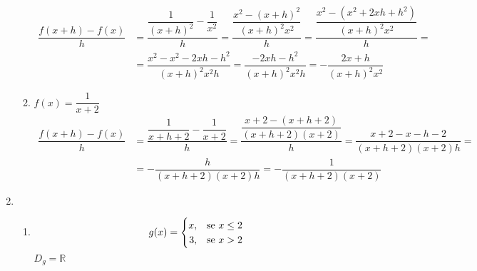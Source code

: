 \begin{enumerate}
\begin{enumerate}
\begin{equation*}
		\begin{split}
		\dfrac{f(x+h)-f(x)}{h}&=\dfrac{\dfrac{1}{(x+h)^2}-\dfrac{1}{x^2}}{h}=\dfrac{\dfrac{x^2-(x+h)^2}{(x+h)^2x^2}}{h}=\dfrac{\dfrac{x^2-(x^2+2xh+h^2)}{(x+h)^2x^2}}{h}=\\
								&=\dfrac{x^2-x^2-2xh-h^2}{(x+h)^2x^2h}=\dfrac{-2xh-h^2}{(x+h)^2x^2h}=-\dfrac{2x+h}{(x+h)^2x^2}
		\end{split}
		\end{equation*}		
		\item %
		$f(x)=\dfrac{1}{x+2}$
		\begin{equation*}
		\begin{split}
		\dfrac{f(x+h)-f(x)}{h}&=\dfrac{\dfrac{1}{x+h+2}-\dfrac{1}{x+2}}{h}=\dfrac{\dfrac{x+2-(x+h+2)}{(x+h+2)(x+2)}}{h}=\dfrac{x+2-x-h-2}{(x+h+2)(x+2)h}=\\
								&=-\dfrac{h}{(x+h+2)(x+2)h}=-\dfrac{1}{(x+h+2)(x+2)}
		\end{split}
		\end{equation*}		
	\end{enumerate}
\item %
	\begin{enumerate}
		\addtocounter{enumii}{9}
		\item %
		\begin{equation*}
		    	g(x) =
			    \begin{cases}
			      \hfill x, & \text{se}\ x \leq 2 \\
			      \hfill 3, & \text{se}\ x > 2 \\
		    	\end{cases}
		\end{equation*}
		$D_g = \mathbb{R}$\\
%
    	

\end{enumerate}
\end{enumerate}
